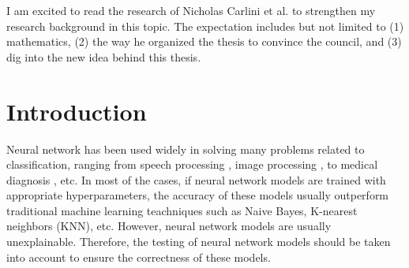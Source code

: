 \documentclass[12pt]{article}
\begin{document}
I am excited to read the research of Nicholas Carlini et al. to strengthen my research background in this topic. The expectation includes but not limited to (1) mathematics, (2) the way he organized the thesis to convince the council, and (3) dig into the new idea behind this thesis.






\newpage
\tableofcontents

\newpage

\listoffigures

\listoftables

\newpage
\section{Introduction}

Neural network has been used widely in solving many problems related to classification, ranging from speech processing \cite{speech-processing}, image processing \cite{image-processing}, to medical diagnosis \cite{medical-diagnosis}, etc. In most of the cases, if neural network models are trained with appropriate hyperparameters, the accuracy of these models usually outperform traditional machine learning teachniques such as Naive Bayes, K-nearest neighbors (KNN), etc. However, neural network models are usually unexplainable. Therefore, the testing of neural network models should be taken into account to ensure the correctness of these models.
\end{document}
